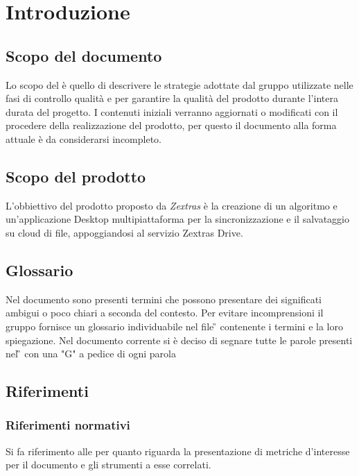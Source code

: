 \section{Introduzione}
\subsection{Scopo del documento}

Lo scopo del  \PdQ{}  è quello di descrivere le strategie adottate dal gruppo \gruppo{} utilizzate nelle fasi di controllo qualità e  per garantire la qualità del prodotto durante l'intera durata del progetto.  I contenuti iniziali verranno aggiornati o modificati con il procedere della realizzazione del prodotto,  per questo il documento alla forma attuale è da considerarsi incompleto.  

\subsection{Scopo del prodotto}

L'obbiettivo del prodotto \progetto{} proposto da \textit{Zextras} è la creazione di  un algoritmo e un'applicazione Desktop multipiattaforma per la sincronizzazione e il salvataggio su cloud di file,  appoggiandosi al servizio Zextras Drive.  

\subsection{Glossario}

Nel documento sono presenti termini che possono presentare dei significati ambigui o poco chiari a seconda del contesto. Per evitare incomprensioni il gruppo fornisce un glossario individuabile nel file \G{} \versGlo{} contenente i termini e la loro spiegazione. Nel documento corrente si è deciso di segnare tutte le parole presenti nel \G{} con una "G" a pedice di ogni parola

\subsection{Riferimenti}
\subsubsection{Riferimenti normativi}
Si fa riferimento alle \NdP{} \versNdP{} per quanto riguarda la presentazione di metriche d'interesse per il documento e gli strumenti a esse correlati. 
